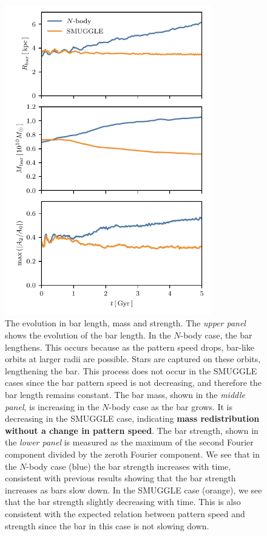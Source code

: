\documentclass[twocolumn,linenumbers,trackchanges]{aastex631}
\newcommand{\Nbody}{$N$-body}
\newcommand{\SMUGGLE}{SMUGGLE}
\begin{document}
\begin{figure}
    \centering
    \includegraphics[width=9cm]{fig/Rb_A2.pdf}
    \caption{The evolution in bar length, mass and strength. The \textit{upper panel}
    shows the evolution of the bar length. In the \Nbody{} case, the bar
    lengthens. This occurs because as the pattern speed drops, bar-like orbits
    at larger radii are possible. Stars are captured on these orbits,
    lengthening the bar. This process does not occur in the \SMUGGLE{} cases
    since the bar pattern speed is not decreasing, and therefore the bar length
    remains constant. The bar mass, shown in the \textit{middle panel}, is
    increasing in the \Nbody{} case as the bar grows. It is decreasing in the
    \SMUGGLE{} case, indicating {\bf mass redistribution without a change in
    pattern speed}. The bar strength, shown in the \textit{lower panel} is
    measured as the maximum of the second Fourier component divided by the
    zeroth Fourier component. We see that in the \Nbody{} case (blue) the bar
    strength increases with time, consistent with previous results showing that
    the bar strength increases as bars slow down. In the \SMUGGLE{} case
    (orange), we see that the bar strength slightly decreasing with time. This
    is also consistent with the expected relation between pattern speed and
    strength since the bar in this case is not slowing down.}
    \label{fig:strength}
\end{figure}
\end{document}
